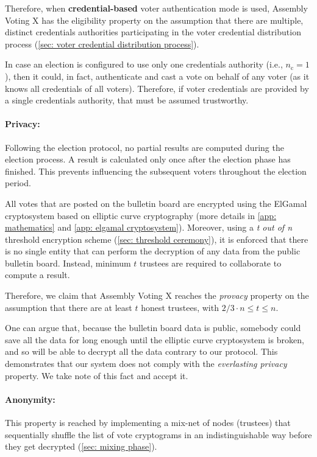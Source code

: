 Therefore, when \textbf{credential-based} voter authentication mode is used, Assembly Voting X has the eligibility property on the assumption that there are multiple, distinct credentials authorities participating in the voter credential distribution process (\cref{sec: voter credential distribution process}).

In case an election is configured to use only one credentials authority (i.e., $n_\mathrm{c} = 1$), then it could, in fact, authenticate and cast a vote on behalf of any voter (as it knows all credentials of all voters). Therefore, if voter credentials are provided by a single credentials authority, that must be assumed trustworthy.


\paragraph{Privacy:}
Following the election protocol, no partial results are computed during the election process. A result is calculated only once after the election phase has finished. This prevents influencing the subsequent voters throughout the election period.

All votes that are posted on the bulletin board are encrypted using the ElGamal cryptosystem based on elliptic curve cryptography (more details in \cref{app: mathematics} and \cref{app: elgamal cryptosystem}). Moreover, using a \textit{t out of n} threshold encryption scheme (\cref{sec: threshold ceremony}), it is enforced that there is no single entity that can perform the decryption of any data from the public bulletin board. Instead, minimum $t$ trustees are required to collaborate to compute a result.

Therefore, we claim that Assembly Voting X reaches the \textit{provacy} property on the assumption that there are at least $t$ honest trustees, with $2/3 \cdot n \leq t \leq n$.

One can argue that, because the bulletin board data is public, somebody could save all the data for long enough until the elliptic curve cryptosystem is broken, and so will be able to decrypt all the data contrary to our protocol. This demonstrates that our system does not comply with the \textit{everlasting privacy} property. We take note of this fact and accept it.


\paragraph{Anonymity:}
This property is reached by implementing a mix-net of nodes (trustees) that sequentially shuffle the list of vote cryptograms in an indistinguishable way before they get decrypted (\cref{sec: mixing phase}).

